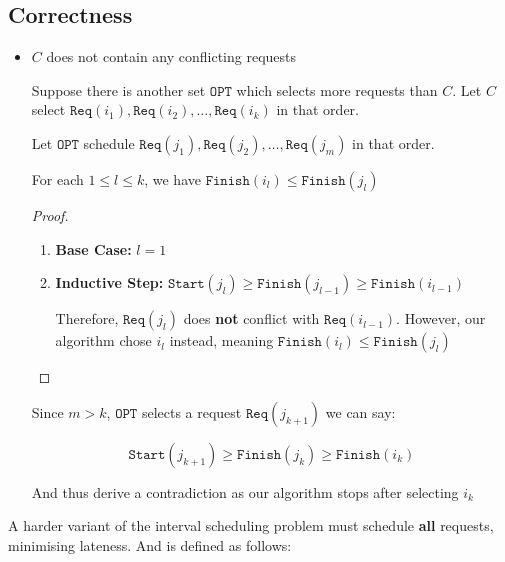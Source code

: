 \documentclass{article}
\newcommand{\F}{\texttt{F }}
\newcommand{\R}[1]{\texttt{Req}(#1)}
\renewcommand{\S}[1]{\texttt{Start}(#1)}
\renewcommand{\F}[1]{\texttt{Finish}(#1)}
\begin{document}
\subsection{Correctness}

\begin{itemize}
  \item $C$ does not contain any conflicting requests

        Suppose there is another set $\texttt{OPT}$ which selects more requests than $C$. Let $C$ select $\R{i_{1}}, \R{i_{2}}, \ldots,\R{i_{k}}$ in that order.

        Let $\texttt{OPT}$ schedule $\R{j_{1}},\R{j_{2}},\ldots, \R{j_{m}}$ in that order.

        \begin{lemma}
          For each $1 \leq l \leq k$, we have $\F{i_{l}} \leq \F{j_{l}}$
        \end{lemma}

        \begin{proof}

          \begin{enumerate}
            \item \textbf{Base Case:} $l=1$
            \item \textbf{Inductive Step:} $\S{j_{l}} \geq \F{j_{l-1}} \geq \F{i_{l-1}}$

                  Therefore, $\R{j_{l}}$ does \textbf{not} conflict with $\R{i_{l-1}}$. However, our algorithm chose $i_{l}$ instead, meaning $\F{i_{l}} \leq \F{j_{l}}$
          \end{enumerate}

        \end{proof}

        Since $m > k$, $\texttt{OPT}$ selects a request $\R{j_{k+1}}$ we can say:

        \[
        \S{j_{k+1}} \geq \F{j_{k}} \geq \F{i_{k}}
        \]

        And thus derive a contradiction as our algorithm stops after selecting $i_{k}$

\end{itemize}

A harder variant of the interval scheduling problem must schedule \textbf{all} requests, minimising lateness. And is defined as follows:
\end{document}
